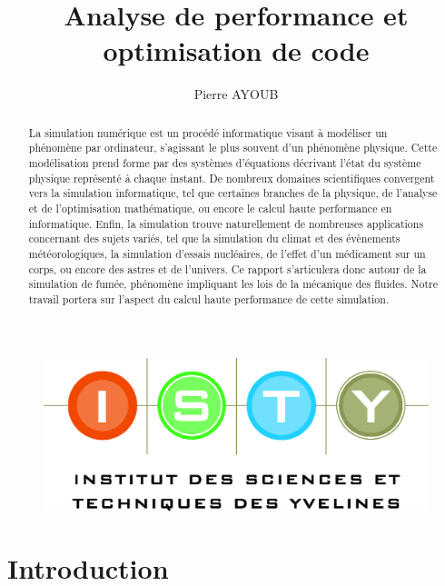 \documentclass[12pt,a4paper]{article}
\begin{document}
\title{Analyse de performance et optimisation de code}
\author{Pierre AYOUB}

\maketitle

\begin{figure}[b]
    \centering
    \includegraphics[scale=0.3]{figures/isty.jpg}
\end{figure}

\newpage
\begin{abstract}

La simulation numérique est un procédé informatique visant à modéliser un
phénomène par ordinateur, s’agissant le plus souvent d’un phénomène
physique. Cette modélisation prend forme par des systèmes d’équations
décrivant l’état du système physique représenté à chaque instant. De
nombreux domaines scientifiques convergent vers la simulation
informatique, tel que certaines branches de la physique, de l’analyse
et de l’optimisation mathématique, ou encore le calcul haute
performance en informatique. Enfin, la simulation trouve naturellement
de nombreuses applications concernant des sujets variés, tel que la
simulation du climat et des évènements météorologiques, la simulation
d’essais nucléaires, de l’effet d’un médicament sur un corps, ou encore
des astres et de l’univers. Ce rapport s’articulera donc autour de la
simulation de fumée, phénomène impliquant les lois de la mécanique des
fluides. Notre travail portera sur l’aspect du calcul haute performance
de cette simulation.

\end{abstract}

\tableofcontents

\section{Introduction}
\label{sec.intro}
\end{document}
